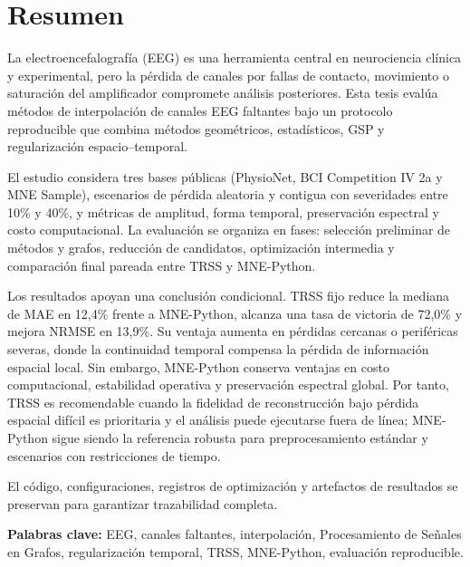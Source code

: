 \chapter*{Resumen}

La electroencefalografía (EEG) es una herramienta central en neurociencia clínica y experimental, pero la pérdida de canales por fallas de contacto, movimiento o saturación del amplificador compromete análisis posteriores. Esta tesis evalúa métodos de interpolación de canales EEG faltantes bajo un protocolo reproducible que combina métodos geométricos, estadísticos, GSP y regularización espacio--temporal.

El estudio considera tres bases públicas (PhysioNet, BCI Competition IV 2a y MNE Sample), escenarios de pérdida aleatoria y contigua con severidades entre 10\% y 40\%, y métricas de amplitud, forma temporal, preservación espectral y costo computacional. La evaluación se organiza en fases: selección preliminar de métodos y grafos, reducción de candidatos, optimización intermedia y comparación final pareada entre TRSS y MNE-Python.

Los resultados apoyan una conclusión condicional. TRSS fijo reduce la mediana de MAE en 12{,}4\% frente a MNE-Python, alcanza una tasa de victoria de 72{,}0\% y mejora NRMSE en 13{,}9\%. Su ventaja aumenta en pérdidas cercanas o periféricas severas, donde la continuidad temporal compensa la pérdida de información espacial local. Sin embargo, MNE-Python conserva ventajas en costo computacional, estabilidad operativa y preservación espectral global. Por tanto, TRSS es recomendable cuando la fidelidad de reconstrucción bajo pérdida espacial difícil es prioritaria y el análisis puede ejecutarse fuera de línea; MNE-Python sigue siendo la referencia robusta para preprocesamiento estándar y escenarios con restricciones de tiempo.

El código, configuraciones, registros de optimización y artefactos de resultados se preservan para garantizar trazabilidad completa.

\vspace{1em}
\noindent\textbf{Palabras clave:} EEG, canales faltantes, interpolación, Procesamiento de Señales en Grafos, regularización temporal, TRSS, MNE-Python, evaluación reproducible.